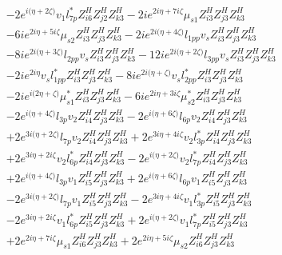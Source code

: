\begin{align}
 &-2 e^{i \Big(\eta +2 \zeta \Big)} v_1 l_{7p}^* Z_{{i 6}}^{H} Z_{{j 2}}^{H} Z_{{k 3}}^{H} -2 i e^{2 i \eta +7 i \zeta } \mu_{s1} Z_{{i 3}}^{H} Z_{{j 3}}^{H} Z_{{k 3}}^{H} \nonumber \\ 
 &-6 i e^{2 i \eta +5 i \zeta } \mu_{s2} Z_{{i 3}}^{H} Z_{{j 3}}^{H} Z_{{k 3}}^{H} -2 i e^{2 i \Big(\eta +4 \zeta \Big)} l_{1pp} v_s Z_{{i 3}}^{H} Z_{{j 3}}^{H} Z_{{k 3}}^{H} \nonumber \\ 
 &-8 i e^{2 i \Big(\eta +3 \zeta \Big)} l_{2pp} v_s Z_{{i 3}}^{H} Z_{{j 3}}^{H} Z_{{k 3}}^{H} -12 i e^{2 i \Big(\eta +2 \zeta \Big)} l_{3pp} v_s Z_{{i 3}}^{H} Z_{{j 3}}^{H} Z_{{k 3}}^{H} \nonumber \\ 
 &-2 i e^{2 i \eta } v_s l_{1pp}^* Z_{{i 3}}^{H} Z_{{j 3}}^{H} Z_{{k 3}}^{H} -8 i e^{2 i \Big(\eta +\zeta \Big)} v_s l_{2pp}^* Z_{{i 3}}^{H} Z_{{j 3}}^{H} Z_{{k 3}}^{H} \nonumber \\ 
 &-2 i e^{i \Big(2 \eta +\zeta \Big)} \mu_{s1}^* Z_{{i 3}}^{H} Z_{{j 3}}^{H} Z_{{k 3}}^{H} -6 i e^{2 i \eta +3 i \zeta } \mu_{s2}^* Z_{{i 3}}^{H} Z_{{j 3}}^{H} Z_{{k 3}}^{H} \nonumber \\ 
 &-2 e^{i \Big(\eta +4 \zeta \Big)} l_{3p} v_2 Z_{{i 4}}^{H} Z_{{j 3}}^{H} Z_{{k 3}}^{H} -2 e^{i \Big(\eta +6 \zeta \Big)} l_{6p} v_2 Z_{{i 4}}^{H} Z_{{j 3}}^{H} Z_{{k 3}}^{H} \nonumber \\ 
 &+2 e^{3 i \Big(\eta +2 \zeta \Big)} l_{7p} v_2 Z_{{i 4}}^{H} Z_{{j 3}}^{H} Z_{{k 3}}^{H} +2 e^{3 i \eta +4 i \zeta } v_2 l_{3p}^* Z_{{i 4}}^{H} Z_{{j 3}}^{H} Z_{{k 3}}^{H} \nonumber \\ 
 &+2 e^{3 i \eta +2 i \zeta } v_2 l_{6p}^* Z_{{i 4}}^{H} Z_{{j 3}}^{H} Z_{{k 3}}^{H} -2 e^{i \Big(\eta +2 \zeta \Big)} v_2 l_{7p}^* Z_{{i 4}}^{H} Z_{{j 3}}^{H} Z_{{k 3}}^{H} \nonumber \\ 
 &+2 e^{i \Big(\eta +4 \zeta \Big)} l_{3p} v_1 Z_{{i 5}}^{H} Z_{{j 3}}^{H} Z_{{k 3}}^{H} +2 e^{i \Big(\eta +6 \zeta \Big)} l_{6p} v_1 Z_{{i 5}}^{H} Z_{{j 3}}^{H} Z_{{k 3}}^{H} \nonumber \\ 
 &-2 e^{3 i \Big(\eta +2 \zeta \Big)} l_{7p} v_1 Z_{{i 5}}^{H} Z_{{j 3}}^{H} Z_{{k 3}}^{H} -2 e^{3 i \eta +4 i \zeta } v_1 l_{3p}^* Z_{{i 5}}^{H} Z_{{j 3}}^{H} Z_{{k 3}}^{H} \nonumber \\ 
 &-2 e^{3 i \eta +2 i \zeta } v_1 l_{6p}^* Z_{{i 5}}^{H} Z_{{j 3}}^{H} Z_{{k 3}}^{H} +2 e^{i \Big(\eta +2 \zeta \Big)} v_1 l_{7p}^* Z_{{i 5}}^{H} Z_{{j 3}}^{H} Z_{{k 3}}^{H} \nonumber \\ 
 &+2 e^{2 i \eta +7 i \zeta } \mu_{s1} Z_{{i 6}}^{H} Z_{{j 3}}^{H} Z_{{k 3}}^{H} +2 e^{2 i \eta +5 i \zeta } \mu_{s2} Z_{{i 6}}^{H} Z_{{j 3}}^{H} Z_{{k 3}}^{H} \nonumber \\ 

\end{align}
